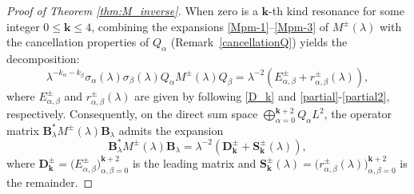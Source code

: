\documentclass[reqno]{amsart}
\numberwithin{equation}{section}
\begin{document}
\begin{proof}[Proof of Theorem \ref{thm:M_inverse}]
	When zero is a $\mathbf{k}$-th kind resonance for some integer $0 \le \mathbf{k} \le 4$, combining the expansions \eqref{Mpm-1}--\eqref{Mpm-3} of $M^\pm(\lambda)$ with the cancellation properties of $Q_\alpha$ (Remark~\ref{cancellationQ}) yields the decomposition:
	\[
	\lambda^{-k_\alpha-k_\beta}\sigma_\alpha(\lambda)\sigma_\beta(\lambda)Q_\alpha M^\pm(\lambda)Q_\beta = \lambda^{-2}\left(E_{\alpha, \beta}^{\pm} + r_{\alpha, \beta}^{\pm}(\lambda)\right),
	\]
	where $E_{\alpha, \beta}^{\pm}$ and $r_{\alpha, \beta}^{\pm}(\lambda)$ are given by following \eqref{D_k} and \eqref{partial}-\eqref{partial2}, respectively.
	Consequently, on the direct sum space $\bigoplus_{\alpha=0}^{\mathbf{k}+2} Q_\alpha L^2$, the operator matrix $\mathbf{B}_\lambda^* M^{\pm}(\lambda) \mathbf{B}_\lambda$ admits the expansion
	\[
	\mathbf{B}_\lambda^* M^{\pm}(\lambda) \mathbf{B}_\lambda= \lambda^{-2} \left( \mathbf{D}_{\mathbf{k}}^{\pm} + \mathbf{S}_{\mathbf{k}}^{\pm}(\lambda) \right),
	\]
	where $\mathbf{D}_{\mathbf{k}}^{\pm} = \bigl( E_{\alpha, \beta}^{\pm} \bigr)_{\alpha, \beta=0}^{\mathbf{k}+2}$ is the leading matrix and $\mathbf{S}_{\mathbf{k}}^{\pm}(\lambda) = \bigl( r_{\alpha, \beta}^{\pm}(\lambda) \bigr)_{\alpha, \beta=0}^{\mathbf{k}+2}$ is the remainder. 
	

\end{proof}
\end{document}
